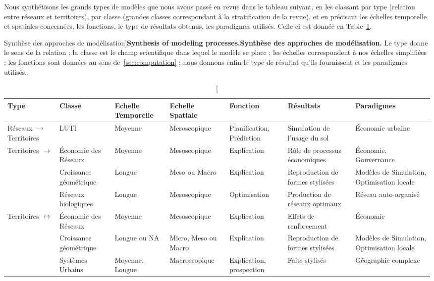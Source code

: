 Nous synthétisons les grands types de modèles que nous avons passé en revue dans le tableau suivant, en les classant par type (relation entre réseaux et territoires), par classe (grandes classes correspondant à la stratification de la revue), et en précisant les échelles temporelle et spatiales concernées, les fonctions, le type de résultats obtenus, les paradigmes utilisés. Celle-ci est donnée en Table~\ref{tab:modelingsa:synthesis}.

\begin{table}%
\caption[Synthesis of modeling processes][Synthèse des approches de modélisation]{\textbf{Synthesis of modeling processes.}\label{tab:modelingsa:synthesis}}{\textbf{Synthèse des approches de modélisation.} Le type donne le sens de la relation ; la classe est le champ scientifique dans lequel le modèle se place ; les échelles correspondent à nos échelles simplifiées ; les fonctions sont données au sens de~\ref{sec:computation} ; nous donnons enfin le type de résultat qu'ils fournissent et les paradigmes utilisés.\label{tab:modelingsa:synthesis}}
\begin{tabular}{|p{2.5cm}|p{2cm}|p{2.5cm}|p{2.5cm}|p{2.1cm}|p{2.2cm}|p{2cm}|}
\hline
Type & Classe & Echelle Temporelle & Echelle Spatiale & Fonction & Résultats & Paradigmes\\ \hline
Réseaux $\rightarrow$ Territoires & LUTI & Moyenne & Mesoscopique & Planification, Prédiction & Simulation de l'usage du sol & Économie urbaine \\ \hline
\multirow{3}{*}{Territoires $\rightarrow$}& Économie des Réseaux & Moyenne & Mesoscopique & Explication & Rôle de processus économiques & Économie, Gouvernance\\\cline{2-7}
Réseaux& Croissance géométrique & Longue & Meso ou Macro & Explication & Reproduction de formes stylisées & Modèles de Simulation, Optimisation locale \\\cline{2-7}
& Réseaux biologiques & Longue & Mesoscopique & Optimisation & Production de réseaux optimaux & Réseau auto-organisé \\ \hline
\multirow{2}{*}{Territoires $\leftrightarrow$}& Économie des Réseaux & Moyenne & Mesoscopique & Explication & Effets de renforcement & Économie\\\cline{2-7}
Réseaux & Croissance géométrique & Longue ou NA & Micro, Meso ou Macro & Explication & Reproduction de formes stylisées & Modèles de Simulation, Optimisation locale \\\cline{2-7}
& Systèmes Urbains & Moyenne, Longue & Macroscopique & Explication, prospection & Faits stylisés & Géographie complexe\\\hline
\end{tabular}
\end{table}

